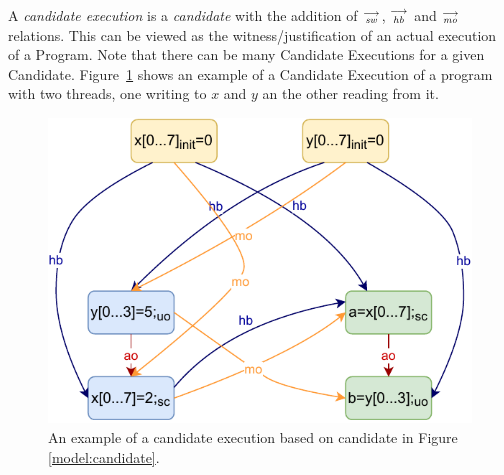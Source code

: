     \begin{definition}
        A \emph{candidate execution} is a \emph{candidate} with the addition of $\stackrel{\longrightarrow}{_\textit{sw}}$, $\stackrel{\longrightarrow}{_\textit{hb}}$ and $\stackrel{\longrightarrow}{_\textit{mo}}$ relations. 
        This can be viewed as the witness/justification of an actual execution of a Program. 
        Note that there can be many Candidate Executions for a given Candidate. 
        Figure~\ref{model:candexec} shows an example of a Candidate Execution of a program with two threads, one writing to $x$ and $y$ an the other reading from it. 
        \begin{figure}[H]
            \centering
            \includegraphics[scale=0.7]{3.ECMAScriptMemoryModel/CandidateExecution.pdf}
            \caption{An example of a candidate execution based on candidate in Figure \ref{model:candidate}.}
            \label{model:candexec}
        \end{figure}
        
    \end{definition}


